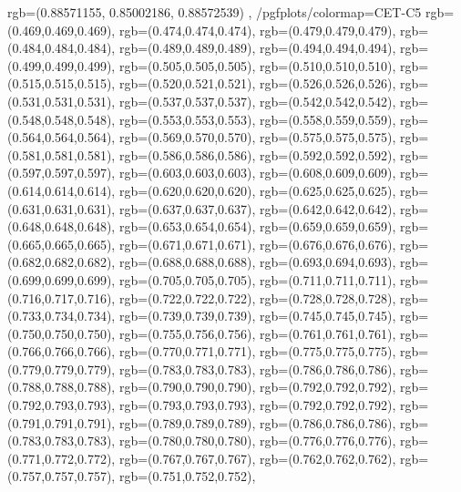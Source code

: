 {{        rgb=(0.88571155, 0.85002186, 0.88572539)
    },
    /pgfplots/colormap={CET-C5}{
        rgb=(0.469,0.469,0.469),
        rgb=(0.474,0.474,0.474),
        rgb=(0.479,0.479,0.479),
        rgb=(0.484,0.484,0.484),
        rgb=(0.489,0.489,0.489),
        rgb=(0.494,0.494,0.494),
        rgb=(0.499,0.499,0.499),
        rgb=(0.505,0.505,0.505),
        rgb=(0.510,0.510,0.510),
        rgb=(0.515,0.515,0.515),
        rgb=(0.520,0.521,0.521),
        rgb=(0.526,0.526,0.526),
        rgb=(0.531,0.531,0.531),
        rgb=(0.537,0.537,0.537),
        rgb=(0.542,0.542,0.542),
        rgb=(0.548,0.548,0.548),
        rgb=(0.553,0.553,0.553),
        rgb=(0.558,0.559,0.559),
        rgb=(0.564,0.564,0.564),
        rgb=(0.569,0.570,0.570),
        rgb=(0.575,0.575,0.575),
        rgb=(0.581,0.581,0.581),
        rgb=(0.586,0.586,0.586),
        rgb=(0.592,0.592,0.592),
        rgb=(0.597,0.597,0.597),
        rgb=(0.603,0.603,0.603),
        rgb=(0.608,0.609,0.609),
        rgb=(0.614,0.614,0.614),
        rgb=(0.620,0.620,0.620),
        rgb=(0.625,0.625,0.625),
        rgb=(0.631,0.631,0.631),
        rgb=(0.637,0.637,0.637),
        rgb=(0.642,0.642,0.642),
        rgb=(0.648,0.648,0.648),
        rgb=(0.653,0.654,0.654),
        rgb=(0.659,0.659,0.659),
        rgb=(0.665,0.665,0.665),
        rgb=(0.671,0.671,0.671),
        rgb=(0.676,0.676,0.676),
        rgb=(0.682,0.682,0.682),
        rgb=(0.688,0.688,0.688),
        rgb=(0.693,0.694,0.693),
        rgb=(0.699,0.699,0.699),
        rgb=(0.705,0.705,0.705),
        rgb=(0.711,0.711,0.711),
        rgb=(0.716,0.717,0.716),
        rgb=(0.722,0.722,0.722),
        rgb=(0.728,0.728,0.728),
        rgb=(0.733,0.734,0.734),
        rgb=(0.739,0.739,0.739),
        rgb=(0.745,0.745,0.745),
        rgb=(0.750,0.750,0.750),
        rgb=(0.755,0.756,0.756),
        rgb=(0.761,0.761,0.761),
        rgb=(0.766,0.766,0.766),
        rgb=(0.770,0.771,0.771),
        rgb=(0.775,0.775,0.775),
        rgb=(0.779,0.779,0.779),
        rgb=(0.783,0.783,0.783),
        rgb=(0.786,0.786,0.786),
        rgb=(0.788,0.788,0.788),
        rgb=(0.790,0.790,0.790),
        rgb=(0.792,0.792,0.792),
        rgb=(0.792,0.793,0.793),
        rgb=(0.793,0.793,0.793),
        rgb=(0.792,0.792,0.792),
        rgb=(0.791,0.791,0.791),
        rgb=(0.789,0.789,0.789),
        rgb=(0.786,0.786,0.786),
        rgb=(0.783,0.783,0.783),
        rgb=(0.780,0.780,0.780),
        rgb=(0.776,0.776,0.776),
        rgb=(0.771,0.772,0.772),
        rgb=(0.767,0.767,0.767),
        rgb=(0.762,0.762,0.762),
        rgb=(0.757,0.757,0.757),
        rgb=(0.751,0.752,0.752),
}}
